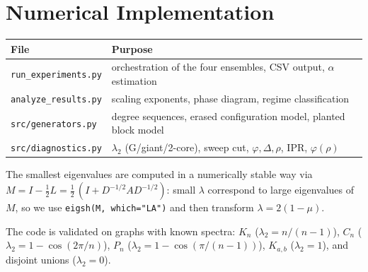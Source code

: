 \documentclass[11pt,a4paper]{article}
\theoremstyle{plain}
\theoremstyle{definition}
\theoremstyle{remark}
\newcommand{\Ph}{\varphi}
\newcommand{\lamtwo}{\lambda_2}
\begin{document}
\appendix
\section{Numerical Implementation}
\label{app:code}

\begin{center}
\begin{tabular}{ll}
\toprule
File & Purpose \\
\midrule
\texttt{run\_experiments.py} & orchestration of the four ensembles, CSV output, $\alpha$ estimation \\
\texttt{analyze\_results.py} & scaling exponents, phase diagram, regime classification \\
\texttt{src/generators.py} & degree sequences, erased configuration model, planted block model \\
\texttt{src/diagnostics.py} & $\lamtwo$ (G/giant/2-core), sweep cut, $\Ph,\Delta,\rho$, IPR, $\Ph(\rho)$ \\
\bottomrule
\end{tabular}
\end{center}

The smallest eigenvalues are computed in a numerically stable way via
$M=I-\tfrac12 L=\tfrac12\,(I+D^{-1/2}AD^{-1/2})$: small $\lambda$ correspond to
large eigenvalues of $M$, so we use \texttt{eigsh(M, which="LA")} and then
transform $\lambda=2(1-\mu)$.

The code is validated on graphs with known spectra: $K_n$
($\lambda_2=n/(n-1)$), $C_n$ ($\lambda_2=1-\cos(2\pi/n)$), $P_n$
($\lambda_2=1-\cos(\pi/(n-1))$), $K_{a,b}$ ($\lambda_2=1$), and disjoint
unions ($\lambda_2=0$).
\end{document}
